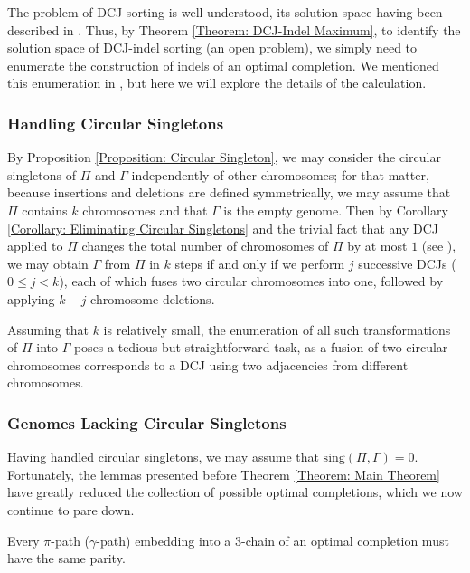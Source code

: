The problem of DCJ sorting is well understood, its solution space having been described in \cite{braga2}.  Thus, by Theorem \ref{Theorem: DCJ-Indel Maximum}, to identify the solution space of DCJ-indel sorting (an open problem), we simply need to enumerate the construction of indels of an optimal completion.  We mentioned this enumeration in \cite{compeau}, but here we will explore the details of the calculation.

\subsubsection*{Handling Circular Singletons} \label{Subsection: Circular Singletons}

By Proposition \ref{Proposition: Circular Singleton}, we may consider the circular singletons of $\Pi$ and $\Gamma$ independently of other chromosomes; for that matter, because insertions and deletions are defined symmetrically, we may assume that $\Pi$ contains $k$ chromosomes and that $\Gamma$ is the empty genome.  Then by Corollary \ref{Corollary: Eliminating Circular Singletons} and the trivial fact that any DCJ applied to $\Pi$ changes the total number of chromosomes of $\Pi$ by at most $1$ (see \cite{yancopoulos}), we may obtain $\Gamma$ from $\Pi$ in $k$ steps if and only if we perform $j$ successive DCJs ($0 \leq j < k$), each of which fuses two circular chromosomes into one, followed by applying $k - j$ chromosome deletions.

Assuming that $k$ is relatively small, the enumeration of all such transformations of $\Pi$ into $\Gamma$ poses a tedious but straightforward task, as a fusion of two circular chromosomes corresponds to a DCJ using two adjacencies from different chromosomes.

\subsubsection*{Genomes Lacking Circular Singletons} \label{Subsection: No Circular Singletons}

Having handled circular singletons, we may assume that $\mathrm{sing}(\Pi, \Gamma) = 0$.  Fortunately, the lemmas presented before Theorem \ref{Theorem: Main Theorem} have greatly reduced the collection of possible optimal completions, which we now continue to pare down.

\begin{proposition}
Every $\pi$-path ($\gamma$-path) embedding into a $3$-chain of an optimal completion must have the same parity.
\label{Proposition: Opposite Parity Paths}
\end{proposition}

